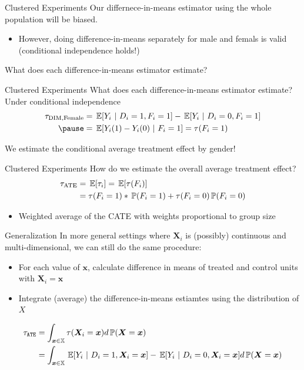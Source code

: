 \documentclass[aspectratio=169,t,11pt,table]{beamer}
\begin{document}
\begin{frame}{Clustered Experiments}
  Our differnece-in-means estimator using the whole population will be biased.
  \begin{itemize}
    \item However, doing difference-in-means separately for male and femals is valid (conditional independence holds!)
  \end{itemize}

  \bigskip
  What does each difference-in-means estimator estimate?
\end{frame}

\begin{frame}{Clustered Experiments}
  What does each difference-in-means estimator estimate? Under conditional independence
  \begin{align*}
    \tau_{\text{DIM},\text{Female}} 
    &= \expec{Y_{i}}{D_i = 1, F_i = 1} - \expec{Y_{i}}{D_i = 0, F_i = 1}  \\ \pause
    &= \expec{Y_{i}(1) - Y_{i}(0)}{F_i = 1} = \tau(F_i = 1)
  \end{align*}

  \bigskip 
  We estimate the conditional average treatment effect by gender!
\end{frame}

\begin{frame}{Clustered Experiments}
  How do we estimate the overall average treatment effect? 
  \begin{align*}
    \tau_{\text{ATE}} &= \expec{\tau_i} = \expec{\tau(F_i)} \\
    &= \tau(F_i = 1) * \prob{F_i = 1} + \tau(F_i = 0) \prob{F_i = 0}
  \end{align*}
  \begin{itemize}
    \item Weighted average of the CATE with weights proportional to group size
  \end{itemize}
\end{frame}

\begin{frame}{Generalization}
  In more general settings where $\bm{X}_i$ is (possibly) continuous and multi-dimensional, we can still do the same procedure:
  \begin{itemize}
    \item For each value of $\bm{x}$, calculate difference in means of treated and control units with $\bm{X}_i = \bm{x}$
    
    \item Integrate (average) the difference-in-means estiamtes using the distribution of $X$ 
  \end{itemize}

  \pause
  \vspace*{-\medskipamount}
  \begin{align*}
    \tau_{\texttt{ATE}} &= 
    \int_{\bm{x} \in \mathbb{X}} \tau(\bm{X}_i = \bm{x}) d\prob{\bm{X} = \bm{x}} \\ 
    &= \int_{\bm{x} \in \mathbb{X}} \expec{Y_i}{D_i = 1, \bm{X}_i = \bm{x}} - \expec{Y_i}{D_i = 0, \bm{X}_i = \bm{x}} d\prob{\bm{X} = \bm{x}}
  \end{align*}
\end{frame}
\end{document}
